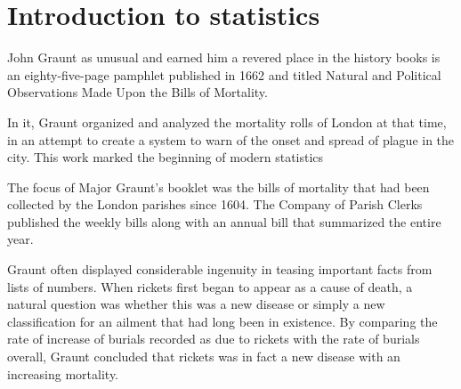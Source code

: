 \chapter{Introduction to statistics}
% 



John Graunt as unusual and earned him a revered place in the history books is an eighty-five-page pamphlet published in 1662 and titled Natural and Political Observations Made Upon the Bills of Mortality.

In it, Graunt organized and analyzed the mortality rolls of London at that time, in an attempt to create a system to warn of the onset and spread of plague in the city. This work marked the beginning of modern statistics

The focus of Major Graunt’s booklet was the bills of mortality that had been collected by the London parishes since 1604. The Company of Parish Clerks published the weekly bills along with an annual bill that summarized the entire year.

Graunt often displayed considerable ingenuity in teasing important facts from lists of numbers. When rickets first began to appear as a cause of death, a natural question was whether this was a new disease or simply a new classification for an ailment that had long been in existence. By comparing the rate of increase of burials recorded as due to rickets with the rate of burials overall, Graunt concluded that rickets was in fact a new disease with an increasing mortality.

